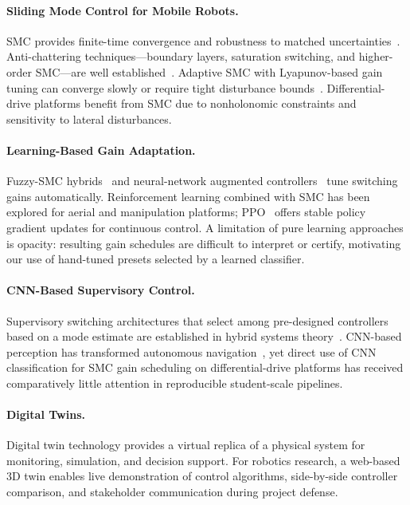 \documentclass[11pt,a4paper]{article}
\begin{document}
\paragraph{Sliding Mode Control for Mobile Robots.}
SMC provides finite-time convergence and robustness to matched uncertainties~\cite{utkin1992}. Anti-chattering techniques---boundary layers, saturation switching, and higher-order SMC---are well established~\cite{shtessel2014,slotine1991}. Adaptive SMC with Lyapunov-based gain tuning can converge slowly or require tight disturbance bounds~\cite{edwards1998}. Differential-drive platforms benefit from SMC due to nonholonomic constraints and sensitivity to lateral disturbances.

\paragraph{Learning-Based Gain Adaptation.}
Fuzzy-SMC hybrids~\cite{lin2006} and neural-network augmented controllers~\cite{ge2004} tune switching gains automatically. Reinforcement learning combined with SMC has been explored for aerial and manipulation platforms; PPO~\cite{schulman2017} offers stable policy gradient updates for continuous control. A limitation of pure learning approaches is opacity: resulting gain schedules are difficult to interpret or certify, motivating our use of hand-tuned presets selected by a learned classifier.

\paragraph{CNN-Based Supervisory Control.}
Supervisory switching architectures that select among pre-designed controllers based on a mode estimate are established in hybrid systems theory~\cite{liberzon2003}. CNN-based perception has transformed autonomous navigation~\cite{lecun2015,levine2016}, yet direct use of CNN classification for SMC gain scheduling on differential-drive platforms has received comparatively little attention in reproducible student-scale pipelines.

\paragraph{Digital Twins.}
Digital twin technology provides a virtual replica of a physical system for monitoring, simulation, and decision support. For robotics research, a web-based 3D twin enables live demonstration of control algorithms, side-by-side controller comparison, and stakeholder communication during project defense.
\end{document}
